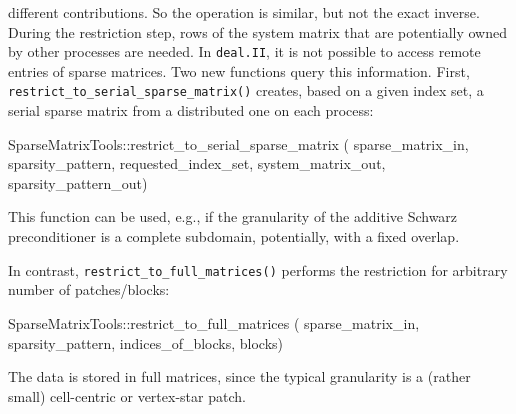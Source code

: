 \documentclass{ansarticle-preprint}
\newcommand{\specialword}[1]{\texttt{#1}}
\newcommand{\dealii}{{\specialword{deal.II}}\xspace}
\begin{document}
\begin{itemize}
{  different contributions. So the operation is similar, but not the
  exact inverse.}
  During the restriction step,
  rows of the system matrix that are potentially owned by other
  processes are needed. In \dealii, it is not possible to access remote entries
  of sparse matrices. Two new functions query this information. First,
  \texttt{restrict\_to\_serial\_sparse\_matrix()} creates, based
  on a given index set, a serial
  sparse matrix from a distributed one on each process:
\begin{c++}
SparseMatrixTools::restrict_to_serial_sparse_matrix (
  sparse_matrix_in, sparsity_pattern, requested_index_set, 
  system_matrix_out, sparsity_pattern_out)
\end{c++}
This function can be used, e.g., if the granularity of the additive Schwarz preconditioner
is a complete subdomain, potentially, with a fixed overlap.

In contrast, \texttt{restrict\_to\_full\_matrices()} performs the restriction
for arbitrary number of patches/blocks:

\begin{c++}
SparseMatrixTools::restrict_to_full_matrices (
  sparse_matrix_in, sparsity_pattern, indices_of_blocks, blocks)
\end{c++}

The data is stored in full matrices, since the typical granularity is a (rather small) cell-centric or
vertex-star patch.
  

\end{itemize}
\end{document}
